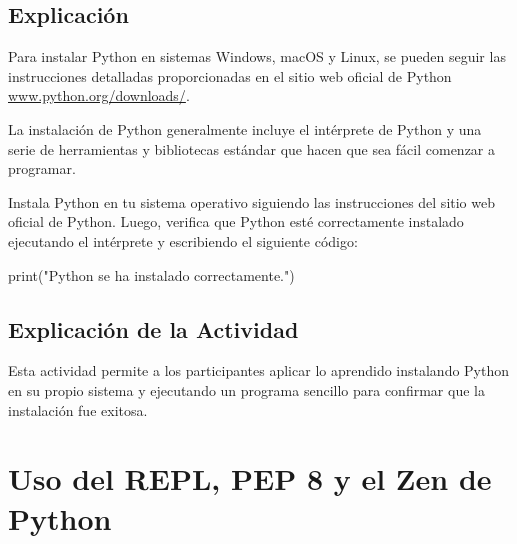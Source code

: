 \documentclass[
  a4paper,
  DIV=11,
  numbers=noendperiod,
  onepage,
  openany]{scrreprt}
\newenvironment{Shaded}{\begin{snugshade}}{\end{snugshade}}
\newcommand{\BuiltInTok}[1]{\textcolor[rgb]{0.00,0.23,0.31}{#1}}
\newcommand{\NormalTok}[1]{\textcolor[rgb]{0.00,0.23,0.31}{#1}}
\newcommand{\StringTok}[1]{\textcolor[rgb]{0.13,0.47,0.30}{#1}}
\begin{document}
\section{Explicación}\label{explicaciuxf3n-1}

Para instalar Python en sistemas Windows, macOS y Linux, se pueden
seguir las instrucciones detalladas proporcionadas en el sitio web
oficial de Python
\href{https://www.python.org/downloads/}{www.python.org/downloads/}.

La instalación de Python generalmente incluye el intérprete de Python y
una serie de herramientas y bibliotecas estándar que hacen que sea fácil
comenzar a programar.

\begin{tcolorbox}[enhanced jigsaw, toptitle=1mm, toprule=.15mm, title=\textcolor{quarto-callout-tip-color}{\faLightbulb}\hspace{0.5em}{Actividad Práctica}, colbacktitle=quarto-callout-tip-color!10!white, opacitybacktitle=0.6, titlerule=0mm, colback=white, left=2mm, bottomrule=.15mm, breakable, bottomtitle=1mm, rightrule=.15mm, colframe=quarto-callout-tip-color-frame, arc=.35mm, leftrule=.75mm, coltitle=black, opacityback=0]

Instala Python en tu sistema operativo siguiendo las instrucciones del
sitio web oficial de Python. Luego, verifica que Python esté
correctamente instalado ejecutando el intérprete y escribiendo el
siguiente código:

\begin{Shaded}
\begin{Highlighting}[]
\BuiltInTok{print}\NormalTok{(}\StringTok{"Python se ha instalado correctamente."}\NormalTok{)}
\end{Highlighting}
\end{Shaded}

\end{tcolorbox}

\section{Explicación de la
Actividad}\label{explicaciuxf3n-de-la-actividad-1}

Esta actividad permite a los participantes aplicar lo aprendido
instalando Python en su propio sistema y ejecutando un programa sencillo
para confirmar que la instalación fue exitosa.

\chapter{Uso del REPL, PEP 8 y el Zen de
Python}\label{uso-del-repl-pep-8-y-el-zen-de-python}
\end{document}
